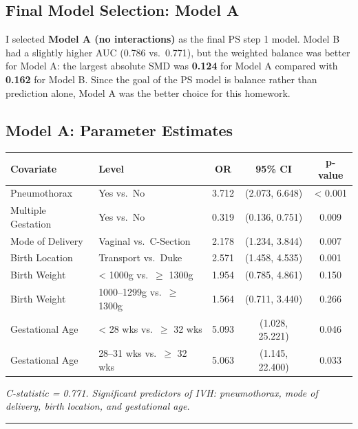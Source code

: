 \documentclass[
]{article}
\begin{document}
\hypertarget{final-model-selection-model-a}{%
\subsection{Final Model Selection: Model
A}\label{final-model-selection-model-a}}

I selected \textbf{Model A (no interactions)} as the final PS step 1
model. Model B had a slightly higher AUC (0.786 vs.~0.771), but the
weighted balance was better for Model A: the largest absolute SMD was
\textbf{0.124} for Model A compared with \textbf{0.162} for Model B.
Since the goal of the PS model is balance rather than prediction alone,
Model A was the better choice for this homework.

\hypertarget{model-a-parameter-estimates}{%
\subsection{Model A: Parameter
Estimates}\label{model-a-parameter-estimates}}

\begin{longtable}[]{@{}llccc@{}}
\toprule
Covariate & Level & OR & 95\% CI & p-value \\
\midrule
\endhead
Pneumothorax & Yes vs.~No & 3.712 & (2.073, 6.648) & \textless{}
0.001 \\
Multiple Gestation & Yes vs.~No & 0.319 & (0.136, 0.751) & 0.009 \\
Mode of Delivery & Vaginal vs.~C-Section & 2.178 & (1.234, 3.844) &
0.007 \\
Birth Location & Transport vs.~Duke & 2.571 & (1.458, 4.535) & 0.001 \\
Birth Weight & \textless{} 1000g vs.~\(\geq\) 1300g & 1.954 & (0.785,
4.861) & 0.150 \\
Birth Weight & 1000--1299g vs.~\(\geq\) 1300g & 1.564 & (0.711, 3.440) &
0.266 \\
Gestational Age & \textless{} 28 wks vs.~\(\geq\) 32 wks & 5.093 &
(1.028, 25.221) & 0.046 \\
Gestational Age & 28--31 wks vs.~\(\geq\) 32 wks & 5.063 & (1.145,
22.400) & 0.033 \\
\bottomrule
\end{longtable}

\emph{C-statistic = 0.771. Significant predictors of IVH: pneumothorax,
mode of delivery, birth location, and gestational age.}

\begin{center}\rule{0.5\linewidth}{0.5pt}\end{center}
\end{document}
